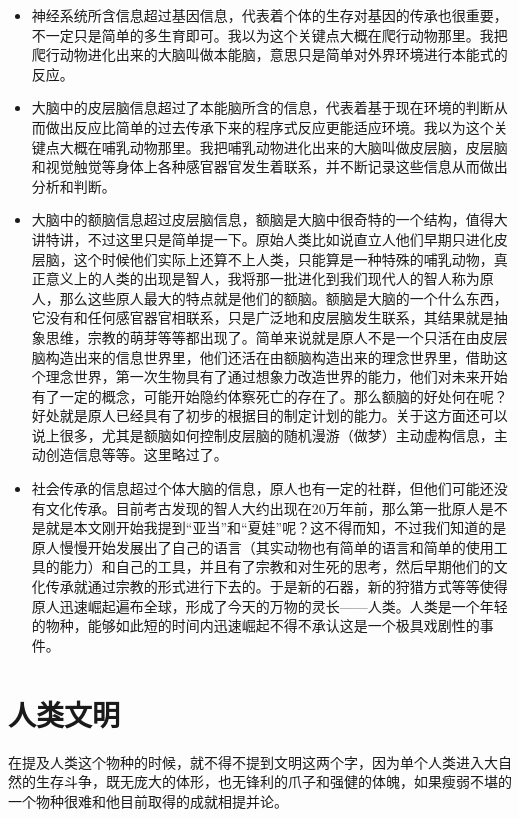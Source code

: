 \documentclass[11pt,oneside]{article}
\begin{document}
\begin{itemize}
\item 神经系统所含信息超过基因信息，代表着个体的生存对基因的传承也很重要，不一定只是简单的多生育即可。我以为这个关键点大概在爬行动物那里。我把爬行动物进化出来的大脑叫做本能脑，意思只是简单对外界环境进行本能式的反应。
\item 大脑中的皮层脑信息超过了本能脑所含的信息，代表着基于现在环境的判断从而做出反应比简单的过去传承下来的程序式反应更能适应环境。我以为这个关键点大概在哺乳动物那里。我把哺乳动物进化出来的大脑叫做皮层脑，皮层脑和视觉触觉等身体上各种感官器官发生着联系，并不断记录这些信息从而做出分析和判断。
\item 大脑中的额脑信息超过皮层脑信息，额脑是大脑中很奇特的一个结构，值得大讲特讲，不过这里只是简单提一下。原始人类比如说直立人他们早期只进化皮层脑，这个时候他们实际上还算不上人类，只能算是一种特殊的哺乳动物，真正意义上的人类的出现是智人，我将那一批进化到我们现代人的智人称为原人，那么这些原人最大的特点就是他们的额脑。额脑是大脑的一个什么东西，它没有和任何感官器官相联系，只是广泛地和皮层脑发生联系，其结果就是抽象思维，宗教的萌芽等等都出现了。简单来说就是原人不是一个只活在由皮层脑构造出来的信息世界里，他们还活在由额脑构造出来的理念世界里，借助这个理念世界，第一次生物具有了通过想象力改造世界的能力，他们对未来开始有了一定的概念，可能开始隐约体察死亡的存在了。那么额脑的好处何在呢？好处就是原人已经具有了初步的根据目的制定计划的能力。关于这方面还可以说上很多，尤其是额脑如何控制皮层脑的随机漫游（做梦）主动虚构信息，主动创造信息等等。这里略过了。
\item 社会传承的信息超过个体大脑的信息，原人也有一定的社群，但他们可能还没有文化传承。目前考古发现的智人大约出现在20万年前，那么第一批原人是不是就是本文刚开始我提到“亚当”和“夏娃”呢？这不得而知，不过我们知道的是原人慢慢开始发展出了自己的语言（其实动物也有简单的语言和简单的使用工具的能力）和自己的工具，并且有了宗教和对生死的思考，然后早期他们的文化传承就通过宗教的形式进行下去的。于是新的石器，新的狩猎方式等等使得原人迅速崛起遍布全球，形成了今天的万物的灵长——人类。人类是一个年轻的物种，能够如此短的时间内迅速崛起不得不承认这是一个极具戏剧性的事件。
\end{itemize}




\section{人类文明}
\label{sec-7}
在提及人类这个物种的时候，就不得不提到文明这两个字，因为单个人类进入大自然的生存斗争，既无庞大的体形，也无锋利的爪子和强健的体魄，如果瘦弱不堪的一个物种很难和他目前取得的成就相提并论。
\end{document}
